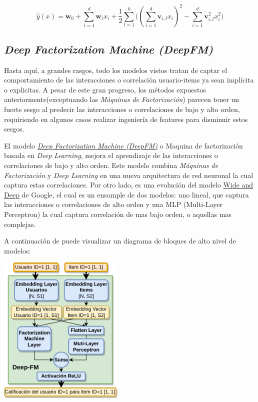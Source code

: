 \documentclass[11pt,a4paper,twoside]{thesis}
\begin{document}
\begin{equation}
	\hat{y}(x) = \mathbf{w}_0 + \sum_{i=1}^d \mathbf{w}_i x_i + \frac{1}{2} \sum_{l=1}^k \big ((\sum_{i=1}^d \mathbf{v}_{i, l} x_i)^2 - \sum_{i=1}^d \mathbf{v}_{i, l}^2 x_i^2)
\end{equation}


\subsection{\textit{Deep Factorization Machine (DeepFM)}}

Hasta aquí, a grandes rasgos, todo los modelos vistos tratan de captar el comportamiento de las interacciones o correlación usuario-items ya sean implícita o explicitas. A pesar de este gran progreso, los métodos expuestos anteriormente(exceptuando las \textit{Máquinas de Factorización}) parecen tener un fuerte sesgo al predecir las interacciones o correlaciones de bajo y alto orden, requiriendo en algunos casos realizar ingeniería de features para disminuir estos sesgos. 

El modelo \href{https://arxiv.org/pdf/1703.04247.pdf}{\textit{Deep Factorization Machine (DeepFM)}} o Maquina de factorización basada en \textit{Deep Learning}, mejora el aprendizaje de las interacciones o correlaciones de bajo y alto orden. Este modelo combina \textit{Máquinas de Factorización} y \textit{Deep Learning} en una nueva arquitectura de red neuronal la cual captura estas correlaciones. Por otro lado, es una evolución del modelo \href{https://arxiv.org/pdf/1606.07792.pdf}{Wide and Deep} de Google, el cual es un ensample de dos modelos: uno lineal, que captura las interacciones o correlaciones de alto orden y una MLP (Multi-Layer Perceptron) la cual captura correlación de mas bajo orden, o aquellas mas complejas.

A continuación de puede visualizar un diagrama de bloques de alto nivel de modelos:

\begin{center}
	\includegraphics[width=6cm]{./images/Deep-MF.png}
\end{center}
\end{document}

